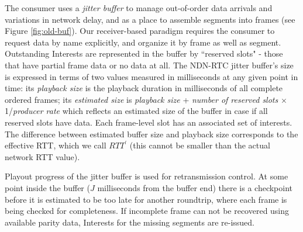 \documentclass{icn/sig-alternate-2013} %
\newcommand{\ndnrtcName}{NDN-RTC} %
\begin{document}
The consumer uses a \textit{jitter buffer} to manage out-of-order data arrivals and variations in network delay, and as a place to assemble segments into frames (see Figure \ref{fig:old-buf}). %
Our receiver-based paradigm requires the consumer to request data by name explicitly, and organize it by frame as well as segment. %
Outstanding Interests are represented in the buffer by ``reserved slots" - those that have partial frame data or no data at all.
The \ndnrtcName{} jitter buffer's size is expressed in terms of two values measured in milliseconds at any given point in time: its \textit{playback size} is the playback duration in milliseconds of all complete ordered frames; its \textit{estimated size} is \textit{playback size} + \textit{number of reserved slots} $\times$ 1/\textit{producer rate} which reflects an estimated size of the buffer in case if all reserved slots have data.  Each frame-level slot has an associated set of interests. 
The difference between estimated buffer size and playback size corresponds to the effective RTT, which we call $RTT^{\prime}$ (this cannot be smaller than the actual network RTT value). %

Playout progress of the jitter buffer is used for retransmission control. %
At some point inside the buffer ($J$ milliseconds from the buffer end) there is a checkpoint before it is estimated to be too late for another roundtrip, where each frame is being checked for completeness. If incomplete frame can not be recovered using available parity data, Interests for the missing segments are re-issued. 
\end{document}
